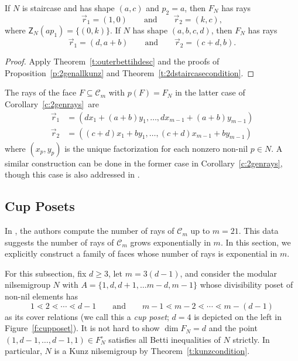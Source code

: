 \documentclass[ALCO, Unicode]{cedram}
\newcommand\cC{{\mathcal C}}
\begin{document}
\begin{coro}\label{c:2genrays}
If $N$ is staircase and has shape $(a,c)$ and $p_2 = a$, then $F_N$ has rays
\[
\vec r_1 = (1, 0)
\qquad \text{and} \qquad
\vec r_2 = (k, c),
\]
where $\mathsf Z_N(ap_1) = \{(0,k)\}$.  
If $N$ has shape $(a,b,c,d)$, then $F_N$ has rays
\[
\vec r_1 = (d, a + b)
\qquad \text{and} \qquad
\vec r_2 = (c + d, b).
\]
\end{coro}

\begin{proof}
Apply Theorem~\ref{t:outerbettihdesc} and the proofs of Proposition~\ref{p:2genallkunz} and Theorem~\ref{t:2dstaircasecondition}.  
\end{proof}

The rays of the face $F \subseteq \cC_m$ with $p(F) = F_N$ in the latter case of Corollary~\ref{c:2genrays}~are 
\begin{align*} 
\vec r_1 &= (dx_1 + (a+b)y_1, \ldots, dx_{m-1}+(a+b)y_{m-1}) \\
\vec r_2 &=  ((c+d)x_1 + by_1, \ldots, (c+d)x_{m-1}+by_{m-1})
\end{align*}
where $(x_p,y_p)$ is the unique factorization for each nonzero non-nil $p \in N$.  
A similar construction can be done in the former case in Corollary~\ref{c:2genrays}, though this case is also addressed in \cite[Theorem~4.6]{kunzfaces2}.  


\subsection{Cup Posets}
\label{subsec:cupposets}

In \cite{wilfmultiplicity}, the authors compute the number of rays of $\cC_m$ up to $m = 21$.  This data suggests the number of rays of $\cC_m$ grows exponentially in $m$.  In this section, we explicitly construct a family of faces whose number of rays is exponential in $m$. 

For this subsection, fix $d \ge 3$, let $m = 3(d-1)$, and consider the modular nilsemigroup $N$ with $A = \{1, d, d+1, \ldots m - d, m - 1\}$ whose divisibility poset of non-nil elements has
\[
1 \lessdot 2 \lessdot \cdots \lessdot d-1 \qquad \text{and} \qquad m-1 \lessdot m-2 \lessdot \cdots \lessdot m - (d-1)
\]
as its cover relations (we call this a \emph{cup poset}; $d = 4$ is depicted on the left in Figure~\ref{f:cupposet}).  
It is not hard to show $\dim F_N = d$ and the point $(1, d-1, \ldots, d-1, 1) \in F_N^\circ$ satisfies all Betti inequalities of $N$ strictly.  In particular, $N$ is a Kunz nilsemigroup by Theorem~\ref{t:kunzcondition}.  
\end{document}
